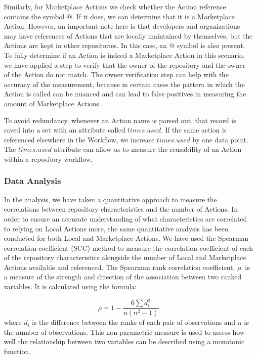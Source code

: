 \documentclass[conference]{IEEEtran}
\begin{document}
Similarly, for Marketplace Actions we check whether the Action reference contains the symbol $@$. If it does, we can determine that it is a Marketplace Action. However, an important note here is that developers and organizations may have references of Actions that are locally maintained by themselves, but the Actions are kept in other repositories. In this case, an $@$ symbol is also present. To fully determine if an Action is indeed a Marketplace Action in this scenario, we have applied a step to verify that the owner of the repository and the owner of the Action do not match. The owner verification step can help with the accuracy of the measurement, because in certain cases the pattern in which the Action is called can be nuanced and can lead to false positives in measuring the amount of Marketplace Actions.
 
            To avoid redundancy, whenever an Action name is parsed out, that record is saved into a set with an attribute called $times.used$. If the same action is referenced elsewhere in the Workflow, we increase $times.used$ by one data point. The $times.used$ attribute can allow us to measure the reusability of an Action within a repository workflow.\\


          \subsubsection{\textbf{Data Analysis}}
            In the analysis, we have taken a quantitative approach to measure the correlations between repository characteristics and the number of Actions. In order to ensure an accurate understanding of what characteristics are correlated to relying on Local Actions more, the same quantitative analysis has been conducted for both Local and Marketplace Actions. We have used the Spearman correlation coefficient (SCC) method to measure the correlation coefficient of each of the repository characteristics alongside the number of Local and Marketplace Actions available and referenced. The Spearman rank correlation coefficient, \(\rho\), is a measure of the strength and direction of the association between two ranked variables. It is calculated using the formula:

            \begin{equation}
            \rho = 1 - \frac{6 \sum d_i^2}{n(n^2 - 1)}
            \end{equation}
where \(d_i\) is the difference between the ranks of each pair of observations and \(n\) is the number of observations. This non-parametric measure is used to assess how well the relationship between two variables can be described using a monotonic function.            
\end{document}
